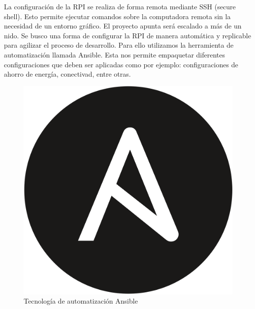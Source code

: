 La configuración de la RPI se realiza de forma remota mediante SSH (secure shell). Esto permite ejecutar comandos sobre la computadora remota sin la necesidad de un entorno gráfico. 
El proyecto apunta será escalado a más de un nido. Se busco una forma de configurar la RPI de manera automática y replicable para agilizar el proceso de desarrollo. Para ello utilizamos la herramienta  de automatización llamada Ansible. Esta nos permite empaquetar diferentes configuraciones que deben ser aplicadas como por ejemplo: configuraciones de ahorro de energía, conectivad, entre otras. 

\begin{figure}[H]
	\centering
	\includegraphics[width=0.2\linewidth]{"../Ingenieria de Detalle/ImagenesIngenieria de Detalle/Ansible_logo"}
	\caption{Tecnología de automatización Ansible}
	\label{fig:ansiblelogo}
\end{figure}














